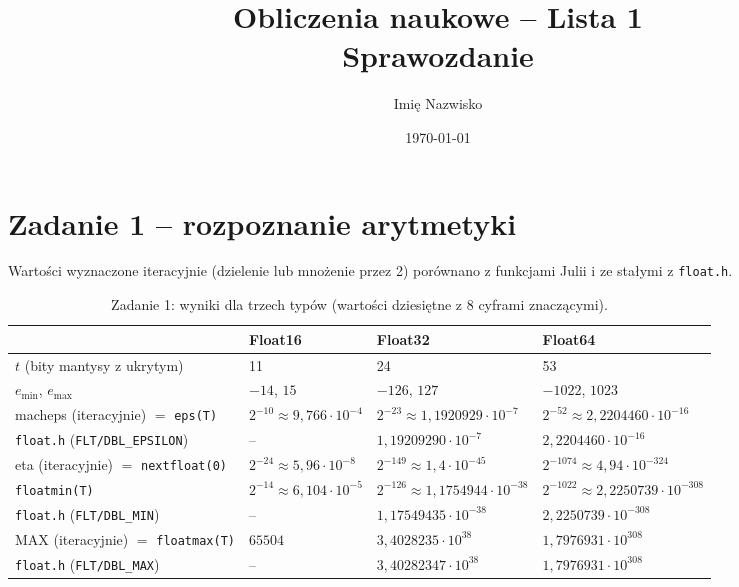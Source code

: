 \documentclass[11pt,a4paper]{article}
\title{Obliczenia naukowe -- Lista 1\\ Sprawozdanie}
\author{Imię Nazwisko}
\date{\today}
\begin{document}
\maketitle

\section{Zadanie 1 -- rozpoznanie arytmetyki}

Wartości wyznaczone iteracyjnie (dzielenie lub mnożenie przez 2) porównano z funkcjami Julii i ze stałymi z \texttt{float.h}.

\begin{table}[h]
\centering\footnotesize\setlength{\tabcolsep}{4pt}
\begin{tabular}{@{}llll@{}}
\toprule
 & Float16 & Float32 & Float64 \\
\midrule
$t$ (bity mantysy z ukrytym) & 11 & 24 & 53 \\
$e_{\min}$, $e_{\max}$ & $-14$, $15$ & $-126$, $127$ & $-1022$, $1023$ \\
\midrule
macheps (iteracyjnie) $=$ \texttt{eps(T)} & $2^{-10}\approx 9{,}766\cdot10^{-4}$ & $2^{-23}\approx1{,}1920929\cdot10^{-7}$ & $2^{-52}\approx2{,}2204460\cdot10^{-16}$ \\
\texttt{float.h} (\texttt{FLT/DBL\_EPSILON}) & -- & $1{,}19209290\cdot10^{-7}$ & $2{,}2204460\cdot10^{-16}$ \\
\midrule
eta (iteracyjnie) $=$ \texttt{nextfloat(0)} & $2^{-24}\approx5{,}96\cdot10^{-8}$ & $2^{-149}\approx1{,}4\cdot10^{-45}$ & $2^{-1074}\approx4{,}94\cdot10^{-324}$ \\
\midrule
\texttt{floatmin(T)} & $2^{-14}\approx6{,}104\cdot10^{-5}$ & $2^{-126}\approx1{,}1754944\cdot10^{-38}$ & $2^{-1022}\approx2{,}2250739\cdot10^{-308}$ \\
\texttt{float.h} (\texttt{FLT/DBL\_MIN}) & -- & $1{,}17549435\cdot10^{-38}$ & $2{,}2250739\cdot10^{-308}$ \\
\midrule
MAX (iteracyjnie) $=$ \texttt{floatmax(T)} & $65504$ & $3{,}4028235\cdot10^{38}$ & $1{,}7976931\cdot10^{308}$ \\
\texttt{float.h} (\texttt{FLT/DBL\_MAX}) & -- & $3{,}40282347\cdot10^{38}$ & $1{,}7976931\cdot10^{308}$ \\
\bottomrule
\end{tabular}
\caption{Zadanie 1: wyniki dla trzech typów (wartości dziesiętne z 8 cyframi znaczącymi).}
\end{table}
\end{document}

